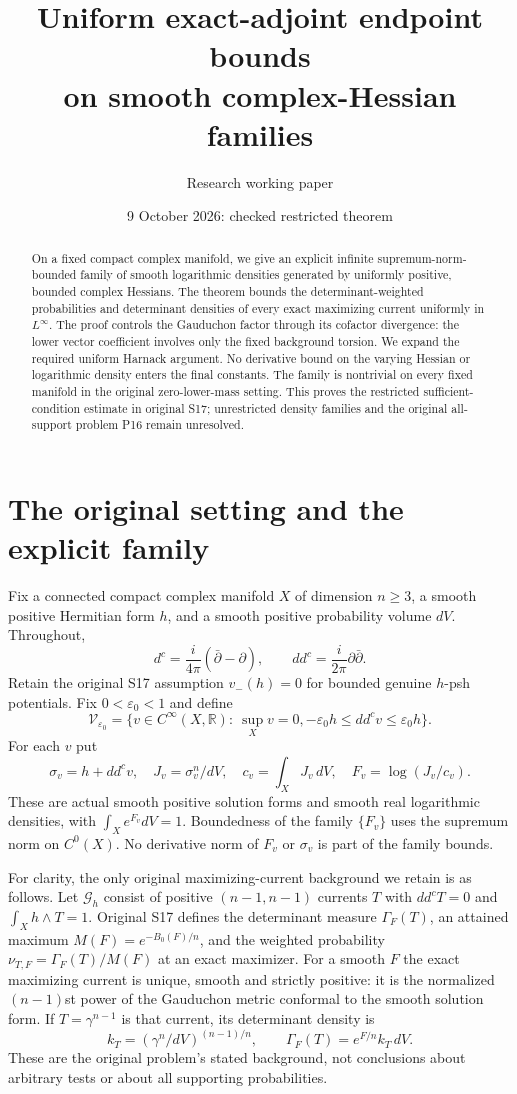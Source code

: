 \documentclass[11pt]{article}
\title{Uniform exact-adjoint endpoint bounds\\
on smooth complex-Hessian families}
\author{Research working paper}
\date{9 October 2026: checked restricted theorem}
\theoremstyle{remark}\newtheorem{remark}[theorem]{Remark}
\newcommand{\ddc}{dd^c}
\begin{document}
\maketitle
\begin{abstract}
On a fixed compact complex manifold, we give an explicit infinite
supremum-norm-bounded family of smooth logarithmic densities generated
by uniformly positive, bounded complex Hessians. The theorem
bounds the determinant-weighted probabilities and determinant densities
of every exact maximizing current uniformly in $L^\infty$.
The proof controls the Gauduchon factor through its cofactor divergence:
the lower vector coefficient involves only the fixed background torsion.
We expand the required uniform Harnack argument. No derivative bound
on the varying Hessian or logarithmic density enters the final constants.
The family is nontrivial on every fixed manifold in the original
zero-lower-mass setting. This proves the restricted sufficient-condition
estimate in original S17; unrestricted density families
and the original all-support problem P16 remain unresolved.
\end{abstract}

\section{The original setting and the explicit family}
Fix a connected compact complex manifold $X$ of dimension $n\geq3$,
a smooth positive Hermitian form $h$, and a smooth positive probability
volume $dV$. Throughout,
\[
 d^c=\frac{i}{4\pi}(\bar\partial-\partial),\qquad
 \ddc=\frac{i}{2\pi}\partial\bar\partial.
\]
Retain the original S17 assumption $v_-(h)=0$ for bounded genuine
$h$-psh potentials. Fix $0<\varepsilon_0<1$ and define
\[
 \mathcal V_{\varepsilon_0}=
 \{v\in C^\infty(X,\mathbb R):\ \sup_Xv=0,
             -\varepsilon_0h\leq\ddc v\leq\varepsilon_0h\}.
\]
For each $v$ put
\[
 \sigma_v=h+\ddc v,\quad J_v=\sigma_v^n/dV,\quad
 c_v=\int_XJ_v\,dV,\quad F_v=\log(J_v/c_v).
\]
These are actual smooth positive solution forms and smooth real
logarithmic densities, with $\int_Xe^{F_v}dV=1$.
Boundedness of the family $\{F_v\}$ uses the supremum norm on $C^0(X)$.
No derivative norm of $F_v$ or $\sigma_v$ is part of the family bounds.

For clarity, the only original maximizing-current background we retain is
as follows. Let $\mathcal G_h$ consist of positive $(n-1,n-1)$ currents
$T$ with $\ddc T=0$ and $\int_Xh\wedge T=1$. Original S17 defines
the determinant measure $\Gamma_F(T)$, an attained maximum
$M(F)=e^{-B_0(F)/n}$, and the weighted probability
$\nu_{T,F}=\Gamma_F(T)/M(F)$ at an exact maximizer. For a smooth $F$
the exact maximizing current is unique, smooth and strictly positive:
it is the normalized $(n-1)$st power of the Gauduchon metric conformal
to the smooth solution form. If $T=\gamma^{n-1}$ is that current, its
determinant density is
\[
 k_T=(\gamma^n/dV)^{(n-1)/n},\qquad
 \Gamma_F(T)=e^{F/n}k_T\,dV.
\]
These are the original problem's stated background, not conclusions
about arbitrary tests or about all supporting probabilities.
\end{document}
